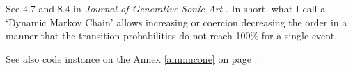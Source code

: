 \bigskip
\color{white}{-}
\color{black}
\bigskip


\bigskip

See  4.7 and 8.4 in \textsl{Journal of Generative Sonic Art} \citep{yi}. In short, what I call a `Dynamic Markov Chain' allows increasing or coercion decreasing the order in a manner that the transition probabilities do not reach 100\% for a single event.
 
See also code instance on the Annex \ref{ann:mcone} on page \pageref{ann:mcone}.


